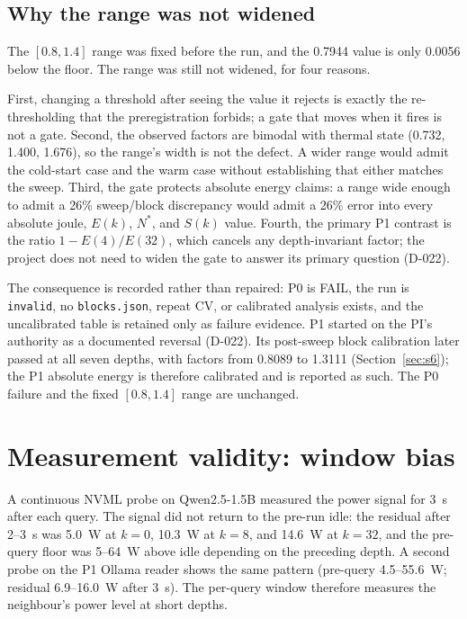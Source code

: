 \subsection{Why the range was not widened}

The $[0.8,1.4]$ range was fixed before the run, and the 0.7944 value is only 0.0056 below the
floor. The range was still not widened, for four reasons.

First, changing a threshold after seeing the value it rejects is exactly the re-thresholding
that the preregistration forbids; a gate that moves when it fires is not a gate. Second, the
observed factors are bimodal with thermal state (0.732, 1.400, 1.676), so the range's width is
not the defect. A wider range would admit the cold-start case and the warm case without
establishing that either matches the sweep. Third, the gate protects absolute energy claims: a
range wide enough to admit a 26\% sweep/block discrepancy would admit a 26\% error into every
absolute joule, $E(k)$, $N^{*}$, and $S(k)$ value. Fourth, the primary P1 contrast is the ratio
$1-E(4)/E(32)$, which cancels any depth-invariant factor; the project does not need to widen
the gate to answer its primary question (D-022).

The consequence is recorded rather than repaired: P0 is FAIL, the run is \texttt{invalid}, no
\texttt{blocks.json}, repeat CV, or calibrated analysis exists, and the uncalibrated table is
retained only as failure evidence. P1 started on the PI's authority as a documented reversal
(D-022). Its post-sweep block calibration later passed at all seven depths, with factors from
0.8089 to 1.3111 (Section~\ref{sec:s6}); the P1 absolute energy is therefore calibrated and is
reported as such. The P0 failure and the fixed $[0.8,1.4]$ range are unchanged.

\section{Measurement validity: window bias}\label{sec:s5b}

A continuous NVML probe on Qwen2.5-1.5B measured the power signal for 3~s after
each query. The signal did not return to the pre-run idle: the residual after
2--3~s was 5.0~W at $k=0$, 10.3~W at $k=8$, and 14.6~W at $k=32$, and the
pre-query floor was 5--64~W above idle depending on the preceding depth. A
second probe on the P1 Ollama reader shows the same pattern (pre-query
4.5--55.6~W; residual 6.9--16.0~W after 3~s). The per-query window therefore
measures the neighbour's power level at short depths.

